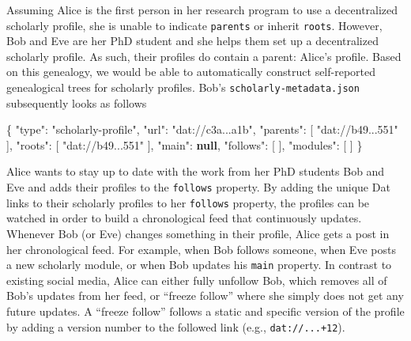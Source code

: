 \documentclass[a4paper]{article}
\newenvironment{Shaded}{\begin{snugshade}}{\end{snugshade}}
\newcommand{\DataTypeTok}[1]{\textcolor[rgb]{0.13,0.29,0.53}{#1}}
\newcommand{\FunctionTok}[1]{\textcolor[rgb]{0.00,0.00,0.00}{#1}}
\newcommand{\KeywordTok}[1]{\textcolor[rgb]{0.13,0.29,0.53}{\textbf{#1}}}
\newcommand{\OtherTok}[1]{\textcolor[rgb]{0.56,0.35,0.01}{#1}}
\newcommand{\StringTok}[1]{\textcolor[rgb]{0.31,0.60,0.02}{#1}}
\begin{document}
Assuming Alice is the first person in her research program to use a
decentralized scholarly profile, she is unable to indicate
\texttt{parents} or inherit \texttt{roots}. However, Bob and Eve are her
PhD student and she helps them set up a decentralized scholarly profile.
As such, their profiles do contain a parent: Alice's profile. Based on
this genealogy, we would be able to automatically construct
self-reported genealogical trees for scholarly profiles. Bob's
\texttt{scholarly-metadata.json} subsequently looks as follows

\begin{Shaded}
\begin{Highlighting}[]
\FunctionTok{\{}
  \DataTypeTok{"type"}\FunctionTok{:} \StringTok{"scholarly-profile"}\FunctionTok{,}
  \DataTypeTok{"url"}\FunctionTok{:} \StringTok{"dat://c3a...a1b"}\FunctionTok{,}
  \DataTypeTok{"parents"}\FunctionTok{:} \OtherTok{[} \StringTok{"dat://b49...551"} \OtherTok{]}\FunctionTok{,}
  \DataTypeTok{"roots"}\FunctionTok{:} \OtherTok{[} \StringTok{"dat://b49...551"} \OtherTok{]}\FunctionTok{,}
  \DataTypeTok{"main"}\FunctionTok{:} \KeywordTok{null}\FunctionTok{,}
  \DataTypeTok{"follows"}\FunctionTok{:} \OtherTok{[} \OtherTok{]}\FunctionTok{,}
  \DataTypeTok{"modules"}\FunctionTok{:} \OtherTok{[} \OtherTok{]}
\FunctionTok{\}}
\end{Highlighting}
\end{Shaded}

Alice wants to stay up to date with the work from her PhD students Bob
and Eve and adds their profiles to the \texttt{follows} property. By
adding the unique Dat links to their scholarly profiles to her
\texttt{follows} property, the profiles can be watched in order to build
a chronological feed that continuously updates. Whenever Bob (or Eve)
changes something in their profile, Alice gets a post in her
chronological feed. For example, when Bob follows someone, when Eve
posts a new scholarly module, or when Bob updates his \texttt{main}
property. In contrast to existing social media, Alice can either fully
unfollow Bob, which removes all of Bob's updates from her feed, or
``freeze follow'' where she simply does not get any future updates. A
``freeze follow'' follows a static and specific version of the profile
by adding a version number to the followed link (e.g.,
\texttt{dat://...+12}).
\end{document}
